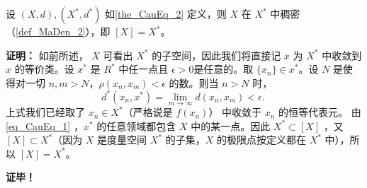 \begin{theorem}{}\label{the_CauEq_4}
设 $(X,d),(X^*,d^*)$ 如\autoref{the_CauEq_2} 定义，则 $X$ 在 $X^*$ 中稠密（\autoref{def_MaDen_2}），即 $[X]=X^*$。
\end{theorem}

\textbf{证明：}
如前所述， $X$ 可看出 $X^*$ 的子空间，因此我们将直接记 $x$ 为 $X^*$ 中收敛到 $x$ 的等价类。设 $x^*$ 是 $R^*$ 中任一点且 $\epsilon>0$是任意的。取 $\{x_n\}\in x^*$。设 $N$ 是使得对一切 $n,m>N$，$\rho(x_n,x_m)<\epsilon$ 的数。则当 $n>N$ 时，
\begin{equation}\label{eq_CauEq_1}
d^*(x_n,x^*)=\lim_{m\rightarrow\infty} d(x_n,x_m)<\epsilon.~
\end{equation}
上式我们已经取了 $x_n\in X^*$（严格说是 $f(x_n)$） 中收敛于 $x_n$ 的恒等代表元。 由\autoref{eq_CauEq_1} ，$x^*$ 的任意领域都包含 $X$ 中的某一点。因此 $X^*\subset [X]$ ，又 $[X]\subset X^*$（因为 $X$ 是度量空间 $X^*$ 的子集，$X$ 的极限点按定义都在 $X^*$ 中），所以 $[X]=X^*$。

\textbf{证毕！}

